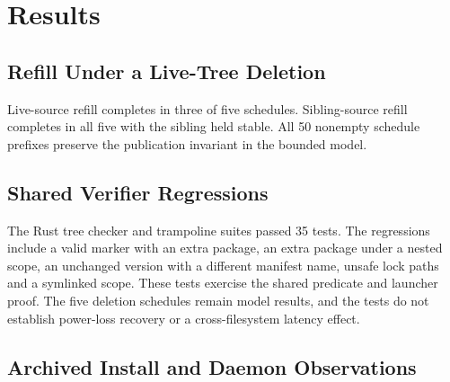 \documentclass[
  11pt,
  letterpaper,
]{article}
\newcounter{none} %
\begin{document}
\section{Results}\label{results}

\subsection{Refill Under a Live-Tree
Deletion}\label{refill-under-a-live-tree-deletion}

Live-source refill completes in three of five schedules. Sibling-source
refill completes in all five with the sibling held stable. All 50
nonempty schedule prefixes preserve the publication invariant in the
bounded model.

\subsection{Shared Verifier
Regressions}\label{shared-verifier-regressions}

The Rust tree checker and trampoline suites passed 35 tests. The
regressions include a valid marker with an extra package, an extra
package under a nested scope, an unchanged version with a different
manifest name, unsafe lock paths and a symlinked scope. These tests
exercise the shared predicate and launcher proof. The five deletion
schedules remain model results, and the tests do not establish
power-loss recovery or a cross-filesystem latency effect.

\subsection{Archived Install and Daemon
Observations}\label{archived-install-and-daemon-observations}
\end{document}
